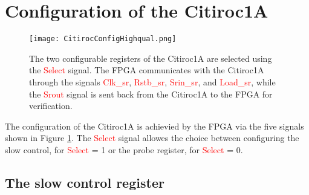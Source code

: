 \section{Configuration of the Citiroc1A}\label{sec:configuration}
\begin{figure}[h]
    \centering
    \texttt{[image: CitirocConfigHighqual.png]}
    \caption{The two configurable registers of the Citiroc1A are selected using the \textcolor{red}{Select} signal. 
    The FPGA communicates with the Citiroc1A through the signals \textcolor{red}{Clk\_sr}, \textcolor{red}{Rstb\_sr}, 
    \textcolor{red}{Srin\_sr}, and \textcolor{red}{Load\_sr}, while the \textcolor{red}{Srout} signal is sent back from the Citiroc1A to the FPGA for verification.\autocite{datasheetCITIROC}}
    \label{fig:CITIROC1A_config}
\end{figure}
The configuration of the Citiroc1A is achievied by the FPGA via the five signals shown in Figure \ref{fig:CITIROC1A_config}.
The \textcolor{red}{Select} signal allowes the choice between configuring the slow control, for \textcolor{red}{Select} = 1  or the probe register, for \textcolor{red}{Select} = 0.\autocite{datasheetCITIROC}

\subsection{The slow control register}

